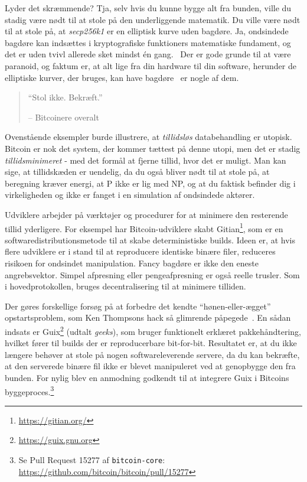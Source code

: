 \documentclass[paper=6in:9in,pagesize=pdftex,
               headinclude=on,footinclude=on,12pt]{scrbook}
\begin{document}
Lyder det skræmmende? Tja, selv hvis du kunne bygge alt fra bunden, ville du stadig være nødt til at stole på den underliggende matematik. Du ville være nødt til at stole på, at \textit{secp256k1} er en elliptisk kurve uden bagdøre. Ja, ondsindede bagdøre kan indsættes i kryptografiske funktioners matematiske fundament, og det er uden tvivl allerede sket mindst \'en gang.~\cite{wiki:Dual_EC_DRBG} Der er gode grunde til at være paranoid, og faktum er, at alt lige fra din hardware til din software, herunder de elliptiske kurver, der bruges, kan have bagdøre~\cite{wiki:backdoors} er nogle af dem.\begin{quotation}\begin{samepage} \enquote{Stol ikke. Bekræft.} \begin{flushright} -- Bitcoinere overalt \end{flushright}\end{samepage}\end{quotation}

Ovenstående eksempler burde illustrere, at \textit{tillidsløs} databehandling er utopisk. Bitcoin er nok det system, der kommer tættest på denne utopi, men det er stadig \textit{tillidsminimeret} - med det formål at fjerne tillid, hvor det er muligt. Man kan sige, at tillidskæden er uendelig, da du også bliver nødt til at stole på, at beregning kræver energi, at P ikke er lig med NP, og at du faktisk befinder dig i virkeligheden og ikke er fanget i en simulation af ondsindede aktører.

Udviklere arbejder på værktøjer og procedurer for at minimere den resterende tillid yderligere. For eksempel har Bitcoin-udviklere skabt Gitian\footnote{\url{https://gitian.org/}}, som er en softwaredistributionsmetode til at skabe deterministiske builds. Ideen er, at hvis flere udviklere er i stand til at reproducere identiske binære filer, reduceres risikoen for ondsindet manipulation. Fancy bagdøre er ikke den eneste angrebsvektor. Simpel afpresning eller pengeafpresning er også reelle trusler. Som i hovedprotokollen, bruges decentralisering til at minimere tilliden.

Der gøres forskellige forsøg på at forbedre det kendte \enquote{hønen-eller-ægget} opstartsproblem, som Ken Thompsons hack så glimrende påpegede~\cite{web:bootstrapping}. En sådan indsats er Guix\footnote{\url{https://guix.gnu.org}} (udtalt \textit{geeks}), som bruger funktionelt erklæret pakkehåndtering, hvilket fører til builds der er reproducerbare bit-for-bit. Resultatet er, at du ikke længere behøver at stole på nogen softwareleverende servere, da du kan bekræfte, at den serverede binære fil ikke er blevet manipuleret ved at genopbygge den fra bunden. For nylig blev en anmodning godkendt til at integrere Guix i Bitcoins byggeproces.\footnote{Se Pull Request 15277 af \texttt{bitcoin-core}: \\ \url{https://github.com/bitcoin/bitcoin/pull/15277}}
\end{document}
